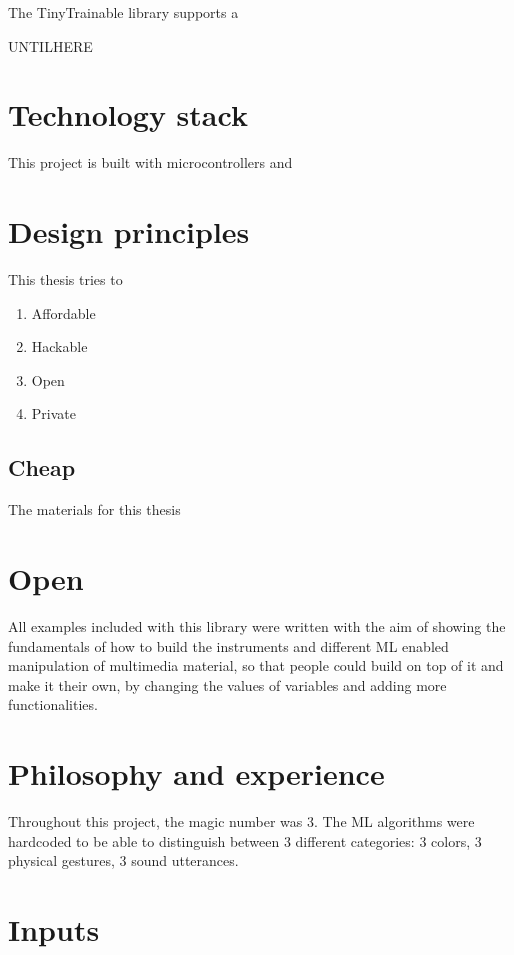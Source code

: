 The TinyTrainable library supports a 

UNTILHERE

\section{Technology stack}

This project is built with microcontrollers and 

\section{Design principles}

This thesis tries to 

\begin{enumerate}
  \item Affordable
  \item Hackable
  \item Open
  \item Private
\end{enumerate}

\subsection{Cheap}

The materials for this thesis 


\section{Open}

All examples included with this library were written with the aim of showing the fundamentals of how to build the instruments and different \acrshort{ML} enabled manipulation of multimedia material, so that people could build on top of it and make it their own, by changing the values of variables and adding more functionalities.

\section{Philosophy and experience}

Throughout this project, the magic number was 3. The \acrshort{ML} algorithms were hardcoded to be able to distinguish between 3 different categories: 3 colors, 3 physical gestures, 3 sound utterances.

\section{Inputs}

